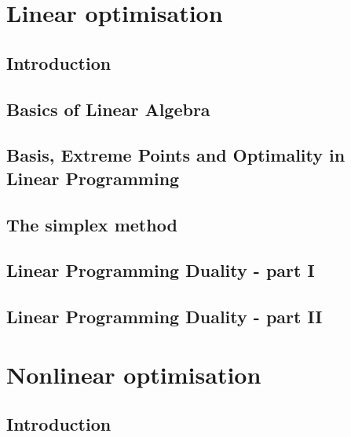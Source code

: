 \documentclass{bookest}
\begin{document}
	

	\tableofcontents
	
	\part{Linear optimisation}
	
	\chapter{Introduction} \label{chapter_1}
	
	
	\chapter{Basics of Linear Algebra} \label{chapter_2}
	
	
	\chapter{Basis, Extreme Points and Optimality in Linear Programming} \label{chapter_3}
		 
	
	\chapter{The simplex method} \label{chapter_4}
		
		
	\chapter{Linear Programming Duality - part I} \label{chapter_5}
		
	
	\chapter{Linear Programming Duality - part II} \label{chapter_6}
	
	
	
	\part{Nonlinear optimisation} \label{part_2}
		
	\chapter{Introduction}
	
	
\end{document}
